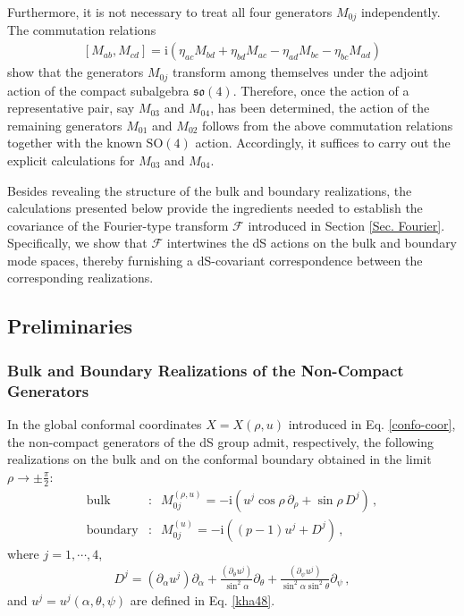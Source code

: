 \documentclass[aps,twocolumn,nofootinbib]{revtex4}
\begin{document}
{\begin{appendix}
Furthermore, it is not necessary to treat all four generators $M_{0j}$ independently. The commutation relations
\begin{align}
    \left[M_{ab},M_{cd}\right] = \mathrm{i}\left( \eta_{ac}M_{bd} + \eta_{bd}M_{ac} - \eta_{ad}M_{bc} - \eta_{bc}M_{ad} \right)
\end{align}
show that the generators $M_{0j}$ transform among themselves under the adjoint action of the compact subalgebra $\mathfrak{so}(4)$. Therefore, once the action of a representative pair, say $M_{03}$ and $M_{04}$, has been determined, the action of the remaining generators $M_{01}$ and $M_{02}$ follows from the above commutation relations together with the known $\mathrm{SO}(4)$ action. Accordingly, it suffices to carry out the explicit calculations for $M_{03}$ and $M_{04}$.

Besides revealing the structure of the bulk and boundary realizations, the calculations presented below provide the ingredients needed to establish the covariance of the Fourier-type transform $\mathcal{F}$ introduced in Section \ref{Sec. Fourier}. Specifically, we show that $\mathcal{F}$ intertwines the dS actions on the bulk and boundary mode spaces, thereby furnishing a dS-covariant correspondence between the corresponding realizations.


\subsection{Preliminaries}


\subsubsection{Bulk and Boundary Realizations of the Non-Compact Generators}

In the global conformal coordinates $X=X(\rho,u)$ introduced in Eq. \eqref{confo-coor}, the non-compact generators of the dS group admit, respectively, the following realizations on the bulk and on the conformal boundary obtained in the limit $\rho\longrightarrow \pm\frac{\pi}{2}$:
\begin{align}
    \mbox{bulk}&:\;\; M^{(\rho,u)}_{0j} = -\mathrm{i} \left( u^j \cos\rho\, \partial_\rho + \sin\rho\, D^j \right) \,, \label{miriambulk}\\[3pt]
    \mbox{boundary}&:\;\; M^{(u)}_{0j} = -\mathrm{i} \left( (p-1) u^j + D^j \right) \label{miriamboundary}\,,
\end{align}
where $j = 1, \cdots, 4$,
\begin{align}\label{def.D}
    D^j = (\partial_\alpha u^j) \partial_\alpha + \frac{(\partial_\theta u^j)}{\sin^2\alpha} \partial_\theta + \frac{(\partial_\psi u^j)}{\sin^2\alpha \sin^2\theta} \partial_\psi \,,   
\end{align}
and $u^j = u^j(\alpha,\theta,\psi)$ are defined in Eq. \eqref{kha48}.



\end{appendix}}
\end{document}
